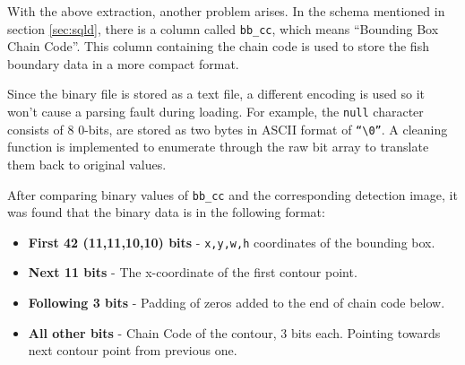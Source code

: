 \documentclass[bsc,frontabs,twoside,fullspacing,parskip,deptreport]{infthesis}
\begin{document}
With the above extraction, another problem arises. 
In the schema mentioned in section \ref{sec:sqld}, there is a column called {\tt bb\_cc}, which means ``Bounding Box Chain Code''. 
This column containing the chain code is used to store the fish boundary data in a more compact format.

Since the binary file is stored as a text file, a different encoding is used so it won't cause a parsing fault during loading.
For example, the {\tt null} character consists of 8 0-bits, are stored as two bytes in ASCII format of {\tt ``\textbackslash0''}. A cleaning function is implemented to enumerate through the raw bit array to translate them back to original values.

After comparing binary values of {\tt bb\_cc} and the corresponding detection image, it was found that the binary data is in the following format:
\begin{itemize}
\setlength{\parskip}{1pt}
\item
\textbf{First 42 (11,11,10,10) bits} - {\tt x,y,w,h} coordinates of the bounding box.
\item
\textbf{Next 11 bits} - The x-coordinate of the first contour point.
\item
\textbf{Following 3 bits} - Padding of zeros added to the end of chain code below.
\item
\textbf{All other bits} - Chain Code of the contour, 3 bits each. Pointing towards next contour point from previous one. 
\end{itemize}

\begin{center}
\vspace{-10pt}
\vspace{5pt}
\end{center}
\end{document}
